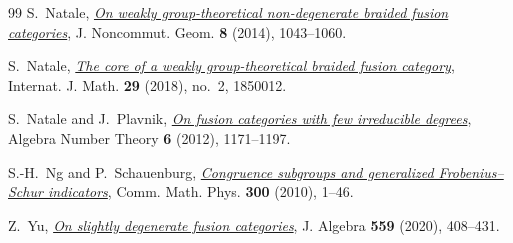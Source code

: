 \documentclass[11pt,a4paper]{article}
\numberwithin{equation}{section}
\begin{document}
\begin{thebibliography}{99}
S.~Natale,
\href{https://doi.org/10.4171/jncg/177}{\emph{On weakly group-theoretical non-degenerate braided fusion categories}},
J. Noncommut. Geom. \textbf{8} (2014), 1043--1060.

S.~Natale,
\href{https://doi.org/10.1142/S0129167X1850012X}{\emph{The core of a weakly group-theoretical braided fusion category}},
Internat. J. Math. \textbf{29} (2018), no.~2, 1850012.

S.~Natale and J.~Plavnik,
\href{https://doi.org/10.2140/ant.2012.6.1171}{\emph{On fusion categories with few irreducible degrees}},
Algebra Number Theory \textbf{6} (2012), 1171--1197.

S.-H.~Ng and P.~Schauenburg, \href{https://doi.org/10.1007/s00220-010-1096-6}{\emph{Congruence subgroups and generalized Frobenius--Schur indicators}}, Comm. Math. Phys. \textbf{300} (2010), 1--46.

Z.~Yu,
\href{https://doi.org/10.1016/j.jalgebra.2020.04.022}{\emph{On slightly degenerate fusion categories}},
J. Algebra \textbf{559} (2020), 408--431.
\end{thebibliography}
\end{document}
